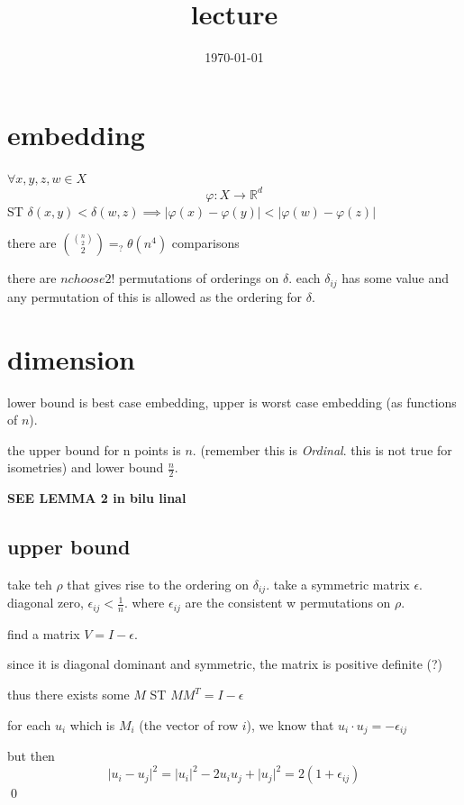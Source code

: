 \documentclass{article}
\title{lecture}
\date{\today}
\theoremstyle{definition}
\begin{document}
\maketitle

\section{embedding}
\(\forall x,y,z,w \in X\)
\begin{equation}
    \varphi:X\to \mathbb R^d
\end{equation}
ST \(\delta(x,y)<\delta(w,z)\implies\lvert\varphi(x)-\varphi(y)\rvert<\lvert\varphi(w)-\varphi(z)\rvert\)

there are \({{n \choose 2 }\choose {2} }=_?\theta(n^4)\) comparisons

there are \(n choose 2 !\) permutations of orderings on \(\delta\). each \(\delta_{ij}\) has some value and any permutation of this is allowed as the ordering for \(\delta\). 

\section{dimension}

lower bound is best case embedding, upper is worst case embedding (as functions of \(n\)).

the upper bound for n points is \(n\). (remember this is \emph{Ordinal}. this is not true for isometries) and lower bound \(\frac{n}{2}\).

\textbf{SEE LEMMA 2 in bilu linal}

\subsection{upper bound}

take teh \(\rho\) that gives rise to the ordering on \(\delta_{ij}\). take a symmetric matrix \(\epsilon\). diagonal zero, \(\epsilon_{ij}<\frac{1}{n} \). where \(\epsilon_{ij}\) are the consistent w permutations on \(\rho\).

find a matrix \(V=I-\epsilon\).

since it is diagonal dominant and symmetric, the matrix is positive definite (?)

thus there exists some \(M\) ST \(MM^T=I-\epsilon\)

for each \(u_i\) which is \(M_i\) (the vector of row \(i\)), we know that \(u_i\cdot u_j=-\epsilon_{ij}\)

but then \begin{equation}
    \lvert u_i-u_j\rvert^2 = \lvert u_i\rvert^2 - 2u_iu_j + \lvert u_j\rvert^2 = 2(1+\epsilon_{ij})
\end{equation}
\qed
\end{document}
